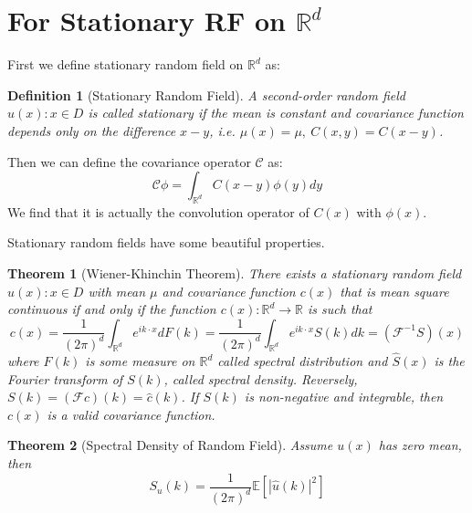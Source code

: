 \documentclass{article}
\newtheorem{theorem}{Theorem}
\newtheorem{definition}{Definition}
\begin{document}
\section{For Stationary RF on $\mathbb{R}^d$}
First we define stationary random field on $\mathbb{R}^d$ as:
\begin{definition}[Stationary Random Field]
  A second-order random field ${u(x): x\in D}$ is called stationary if the mean is constant and covariance function 
  depends only on the difference $x-y$, i.e. $\mu(x) = \mu,\ C(x, y) = C(x-y)$.
\end{definition}
Then we can define the covariance operator $\mathcal{C}$ as:
\begin{equation}
  \mathcal{C}\phi = \int_{\mathbb{R}^d} C(x-y)\phi(y)dy
\end{equation}
We find that it is actually the convolution operator of $C(x)$ with $\phi(x)$.

Stationary random fields have some beautiful properties.
\begin{theorem}[Wiener-Khinchin Theorem]
    There exists a stationary random field ${u(x): x\in D}$ with mean $\mu$ and covariance function $c(x)$ that is mean square continuous if and only if 
    the function $c(x): \mathbb{R}^d\rightarrow \mathbb{R}$ is such that 
    \begin{equation}
        c(x) = \frac{1}{(2\pi)^{d}}\int_{\mathbb{R}^d} e^{ik \cdot x}dF(k)=\frac{1}{(2\pi)^{d}}\int_{\mathbb{R}^d} e^{ik \cdot x}S(k)dk = \left(\mathcal{F}^{-1}S\right)(x)
    \end{equation}
    where $F(k)$ is some measure on $\mathbb{R}^d$ called spectral distribution and $\hat{S}(x)$ is the Fourier transform of $S(k)$, 
	called spectral density.
    Reversely, $S(k) = \left(\mathcal{F}c\right)(k) = \hat{c}(k)$.
    If $S(k)$ is non-negative and integrable, then $c(x)$ is a valid covariance function.
\end{theorem}

\begin{theorem}[Spectral Density of Random Field]\label{spectral_density_random_field}
	Assume $u(x)$ has zero mean, then 
\begin{equation}\label{spectraldensity}
	S_u(k)=\frac{1}{(2\pi)^{d}}\mathbb{E}[|\hat{u}(k)|^2]
\end{equation}
\end{theorem}



\end{document}
